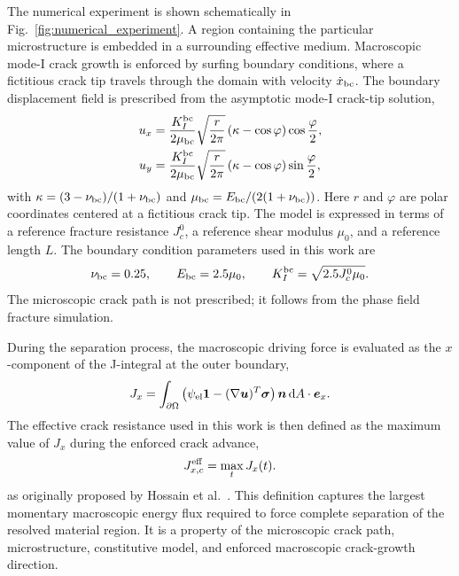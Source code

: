 \documentclass[pamm,a4paper,fleqn]{w-art}
\newcommand{\Jeff}{J_{x,c}^{\rm eff}}
\begin{document}
The numerical experiment is shown schematically in
Fig.~\ref{fig:numerical_experiment}. A region containing the
particular
microstructure is embedded in a surrounding effective medium.
Macroscopic mode-I crack growth is enforced by surfing boundary
conditions, where a fictitious crack tip travels through the domain
with velocity \(\dot{x}_{\rm bc}\). The boundary displacement field
is prescribed from the asymptotic mode-I crack-tip solution,
\begin{align}
  u_x & = \frac{K_I^{\rm bc}}{2\mu_{\rm bc}}
  \sqrt{\frac{r}{2\pi}}
  \left(\kappa-\cos\varphi\right)
  \cos\frac{\varphi}{2}, \\
  u_y & = \frac{K_I^{\rm bc}}{2\mu_{\rm bc}}
  \sqrt{\frac{r}{2\pi}}
  \left(\kappa-\cos\varphi\right)
  \sin\frac{\varphi}{2},
  \label{eq:surfing-bcs}
\end{align}
with \(\kappa=(3-\nu_{\rm bc})/(1+\nu_{\rm bc})\) and
\(\mu_{\rm bc}=E_{\rm bc}/(2(1+\nu_{\rm bc}))\). Here \(r\) and
\(\varphi\) are polar coordinates centered at a fictitious crack
tip. The model is expressed in terms of a reference fracture
resistance \(J_c^0\), a reference shear modulus \(\mu_0\), and a
reference length \(L\). The boundary condition parameters used in
this work are
\begin{equation}
  \nu_{\rm bc}=0.25,\qquad
  E_{\rm bc}=2.5\mu_0,\qquad
  K_I^{\rm bc}=\sqrt{2.5J_c^0\mu_0}.
\end{equation}
The microscopic crack path is not prescribed; it follows from the
phase field fracture simulation.

During the separation process, the macroscopic driving force is
evaluated as the \(x\)-component of the J-integral at the outer
boundary,
\begin{equation}
  J_x = \int_{\partial\Omega}
  \left(
  \psi_{\rm el}\boldsymbol{1}
  - (\nabla\boldsymbol{u})^T\boldsymbol{\sigma}
  \right)
  \boldsymbol{n}\,{\rm d}A \cdot \boldsymbol{e}_x .
  \label{eq:J-integral}
\end{equation}
The effective crack resistance used in this work is then defined as
the maximum value of \(J_x\) during the enforced crack advance,
\begin{equation}
  \Jeff = \max_t J_x(t).
  \label{eq:effective_resistance}
\end{equation}
as originally proposed by Hossain
et al.~\cite{hossain_effective_2014}. This definition captures the
largest momentary macroscopic energy flux required
to force complete separation of the resolved material region. It is
a property of the microscopic crack path, microstructure,
constitutive model, and enforced macroscopic crack-growth direction.
\end{document}
